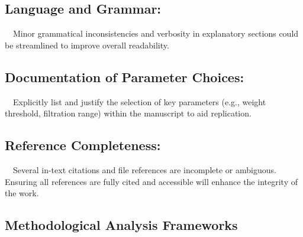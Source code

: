 \documentclass{article}
\begin{document}
\subsection{Language and Grammar:  }
 Minor grammatical inconsistencies and verbosity in explanatory sections could be streamlined to improve overall readability.

\subsection{Documentation of Parameter Choices:  }
 Explicitly list and justify the selection of key parameters (e.g., weight threshold, filtration range) within the manuscript to aid replication.

\subsection{Reference Completeness:  }
 Several in-text citations and file references are incomplete or ambiguous. Ensuring all references are fully cited and accessible will enhance the integrity of the work.

\hrulefill
\subsection{Methodological Analysis Frameworks}
\end{document}
